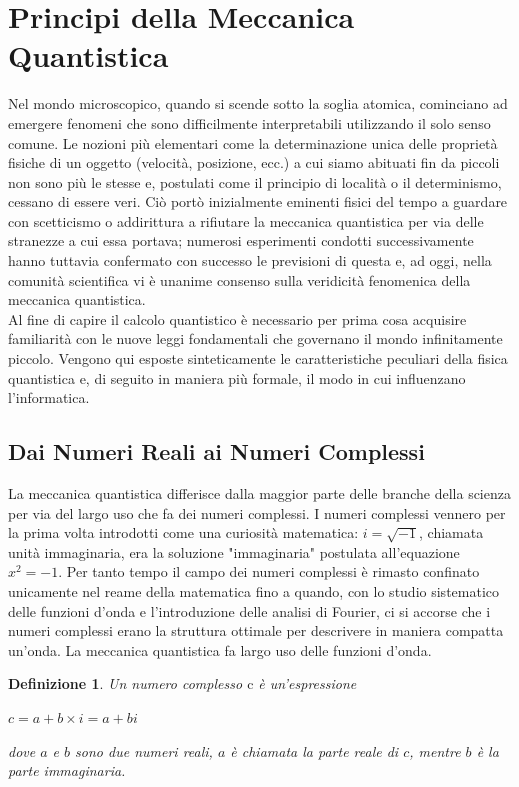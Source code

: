 \documentclass[12pt,a4paper,openright]{report}
\newtheorem{mydef}{Definizione}[chapter]
\begin{document}
\section{Principi della Meccanica Quantistica}
Nel mondo microscopico, quando si scende sotto la soglia atomica, cominciano ad emergere fenomeni che sono difficilmente interpretabili utilizzando il solo senso comune.
Le nozioni più elementari come la determinazione unica delle proprietà fisiche di un oggetto (velocità, posizione, ecc.) a cui siamo abituati fin da piccoli non sono più le stesse e,
postulati come il principio di località o il determinismo, cessano di essere veri.
Ciò portò inizialmente eminenti fisici del tempo a guardare con scetticismo o addirittura a rifiutare la meccanica quantistica per via delle stranezze a cui essa portava;
numerosi esperimenti condotti successivamente hanno tuttavia confermato con successo le previsioni di questa e, ad oggi, nella comunità scientifica vi è unanime consenso sulla veridicità fenomenica della meccanica quantistica.\\
Al fine di capire il calcolo quantistico è necessario per prima cosa acquisire familiarità con le nuove leggi fondamentali che governano il mondo infinitamente piccolo.
Vengono qui esposte sinteticamente le caratteristiche peculiari della fisica quantistica e, di seguito in maniera più formale, il modo in cui influenzano l'informatica.

\subsection{Dai Numeri Reali ai Numeri Complessi}
La meccanica quantistica differisce dalla maggior parte delle branche della scienza per via del largo uso che fa dei numeri complessi.
I numeri complessi vennero per la prima volta introdotti come una curiosità matematica: $i=\sqrt{-1}$, chiamata unità immaginaria, era la soluzione "immaginaria" postulata
all'equazione $x^2=-1$. Per tanto tempo il campo dei numeri complessi è rimasto confinato unicamente nel reame della matematica fino a quando,
con lo studio sistematico delle funzioni d'onda e l'introduzione delle analisi di Fourier, ci si accorse che i numeri complessi erano la struttura
ottimale per descrivere in maniera compatta un'onda. La meccanica quantistica fa largo uso delle funzioni d'onda.\par
\begin{mydef}
    Un numero complesso $\text{c}$ è un'espressione
    \begin{center}
        $c = a + b \times i = a + bi$\\
    \end{center}
        dove $a$ e $b$ sono due numeri reali, $a$ è chiamata la parte reale di $c$, mentre $b$ è la parte immaginaria.
    
\end{mydef}
\end{document}
